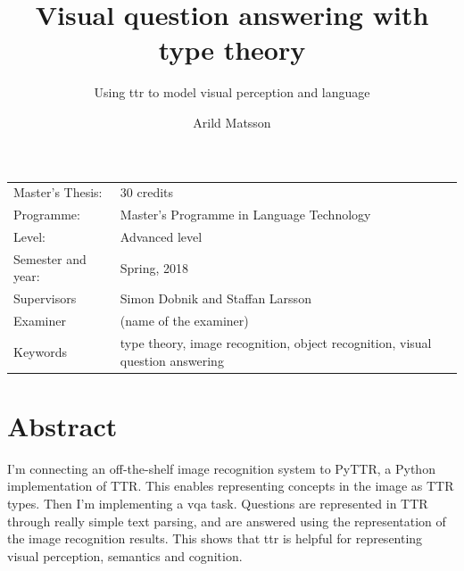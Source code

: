\documentclass[11pt, a4paper]{article}
\title{Visual question answering with type theory}
\subtitle{Using \gls{ttr} to model visual perception and language}
\author{Arild Matsson}
\date{}
\begin{document}
\begin{titlepage}

\maketitle

\vfill

\begingroup
\renewcommand*{\arraystretch}{1.2}
\begin{tabular}{l@{\hskip 20mm}l}
\hline
Master's Thesis: & 30 credits\\
Programme: & Master’s Programme in Language Technology\\
Level: & Advanced level \\
Semester and year: & Spring, 2018\\
Supervisors & Simon Dobnik and Staffan Larsson\\
Examiner & (name of the examiner)\\
Keywords & type theory, image recognition, object recognition, visual question answering
\end{tabular}
\endgroup

\thispagestyle{empty}
\end{titlepage}

\newpage
\singlespacing
\section*{Abstract}

I'm connecting an off-the-shelf image recognition system to PyTTR, a Python implementation of TTR.
This enables representing concepts in the image as TTR types.
Then I'm implementing a \gls{vqa} task.
Questions are represented in TTR through really simple text parsing, and are answered using the representation of the image recognition results.
This shows that \gls{ttr} is helpful for representing visual perception, semantics and cognition.
\glsresetall

\thispagestyle{empty}

\newpage
\end{document}
